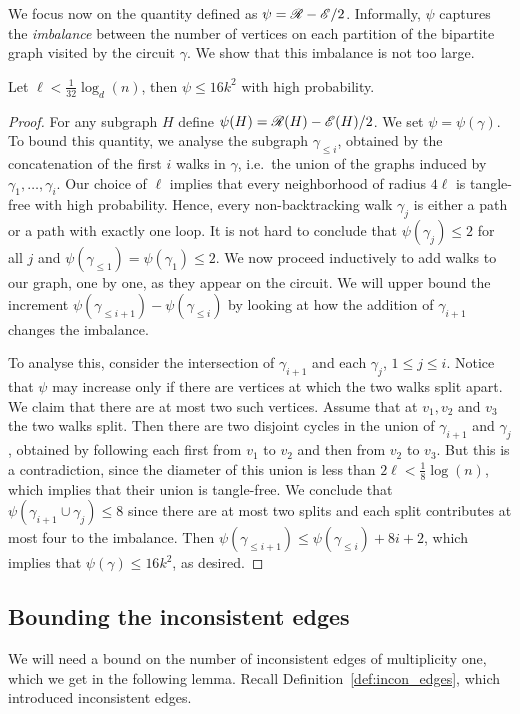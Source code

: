We focus now on the quantity defined as 
$\psi = \mathscr{R} - \mathscr{E} / 2 $. 
Informally, $\psi$ captures the {\it imbalance} between the number of vertices 
on each partition of the bipartite graph visited by the circuit $\gamma$. 
We show that this imbalance is not too large.
\begin{lemma}\label{lem:imbalance}
Let $\ell < \frac{1}{32} \log_d(n)$,
then $\psi \leq 16 k^2$ with high probability.
\end{lemma}
\begin{proof}
For any subgraph $H$ define $\psi(H) = \mathscr{R}(H)-\mathscr{E}(H)/2$. 
We set $\psi=\psi(\gamma)$. 
To bound this quantity, we analyse the subgraph 
$\gamma_{\leq i}$, 
obtained by the concatenation of the first $i$ walks in $\gamma$,
i.e.\ the union of the graphs induced by $\gamma_1, \ldots, \gamma_i$.
Our choice of $\ell$ 
implies that every neighborhood of radius $4\ell$ is tangle-free with high probability. Hence, every non-backtracking walk $\gamma_j$ 
is either a path or a path with exactly one loop.
It is not hard to conclude that 
$\psi(\gamma_j) \leq 2$ for all $j$ and 
$\psi(\gamma_{\leq 1}) = \psi(\gamma_1) \leq 2$. 
We now proceed inductively to add walks to our graph, one by one, 
as they appear on the circuit.
We will upper bound the increment 
$\psi(\gamma_{\leq i+1}) - \psi(\gamma_{\leq i})$ 
by looking at how the addition of $\gamma_{i+1}$ changes the imbalance. 

To analyse this, consider the intersection of 
$\gamma_{i+1}$ and each $\gamma_j$, $1\leq j\leq i$. 
Notice that $\psi$ may increase only if there are vertices 
at which the two walks split apart. 
We claim that there are at most two such vertices. 
Assume that at $v_1,v_2$ and $v_3$ the two walks split. 
Then there are two disjoint cycles in the union of $\gamma_{i+1}$ and $\gamma_j$, 
obtained by following each first from $v_1$ to $v_2$ 
and then from $v_2$ to $v_3$. 
But this is a contradiction, 
since the diameter of this union is less than $2 \ell < \frac{1}{8} \log(n)$,
which implies that their union is tangle-free. 
We conclude that $\psi(\gamma_{i+1} \cup \gamma_j) \leq 8$
since there are at most two splits and 
each split contributes at most four to the imbalance. 
Then
$\psi(\gamma_{\leq i+1}) \leq \psi(\gamma_{\leq i}) + 8i + 2$,
which implies that $\psi(\gamma)\leq 16k^2$, as desired.
\end{proof}

\subsection{Bounding the inconsistent edges} 
We will need a bound on the number of inconsistent edges of multiplicity one,
which we get in the following lemma. Recall Definition~\ref{def:incon_edges}, which introduced inconsistent edges. 

